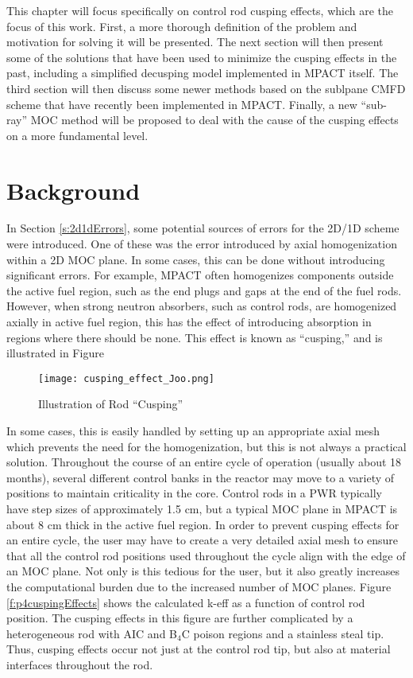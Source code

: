 This chapter will focus specifically on control rod cusping effects, which are the focus of this work.  First, a more thorough definition of the problem and motivation for solving it will be presented.  The next section will then present some of the solutions that have been used to minimize the cusping effects in the past, including a simplified decusping model implemented in MPACT itself.  The third section will then discuss some newer methods based on the sublpane CMFD scheme that have recently been implemented in MPACT.  Finally, a new ``sub-ray'' MOC method will be proposed to deal with the cause of the cusping effects on a more fundamental level.

\section{Background}

In Section \ref{s:2d1dErrors}, some potential sources of errors for the 2D/1D scheme were introduced.  One of these was the error introduced by axial homogenization within a 2D MOC plane.  In some cases, this can be done without introducing significant errors.  For example, MPACT often homogenizes components outside the active fuel region, such as the end plugs and gaps at the end of the fuel rods.  However, when strong neutron absorbers, such as control rods, are homogenized axially in active fuel region, this has the effect of introducing absorption in regions where there should be none.  This effect is known as ``cusping,'' \cite{finnemann1977RodCuspingOrigMention} and is illustrated in Figure 

\begin{figure}
    \centering
    \texttt{[image: cusping\_effect\_Joo.png]}
    \caption[Rod Cusping Illustration]{Illustration of Rod ``Cusping'' \cite{ICAPPcontrolRodDecuspingNTRACER}}\label{f:cuspingEffectJoo}
\end{figure}

In some cases, this is easily handled by setting up an appropriate axial mesh which prevents the need for the homogenization, but this is not always a practical solution.  Throughout the course of an entire cycle of operation (usually about 18 months), several different control banks in the reactor may move to a variety of positions to maintain criticality in the core.  Control rods in a PWR typically have step sizes of approximately 1.5 cm, but a typical MOC plane in MPACT is about 8 cm thick in the active fuel region.  In order to prevent cusping effects for an entire cycle, the user may have to create a very detailed axial mesh to ensure that all the control rod positions used throughout the cycle align with the edge of an MOC plane.  Not only is this tedious for the user, but it also greatly increases the computational burden due to the increased number of MOC planes.  Figure \ref{f:p4cuspingEffects} shows the calculated k-eff as a function of control rod position.  The cusping effects in this figure are further complicated by a heterogeneous rod with AIC and B$_4$C poison regions and a stainless steal tip.  Thus, cusping effects occur not just at the control rod tip, but also at material interfaces throughout the rod.

